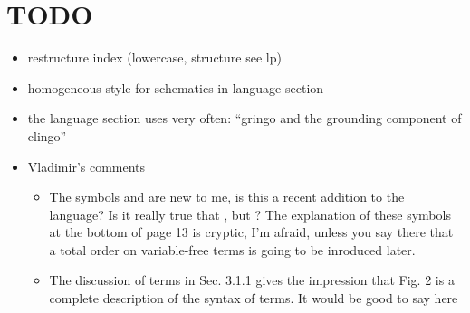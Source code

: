 \section{TODO}
\begin{itemize}
\item restructure index (lowercase, structure see lp)
\item homogeneous style for schematics in language section
\item the language section uses very often: ``gringo and the grounding component of clingo''
\item Vladimir's comments
\begin{itemize}
 \item 
  The symbols  and  are new to me, is this a recent addition to the
  language?  Is it really true that , but ?
  The explanation of these symbols at the bottom of page 13 is cryptic, I’m
  afraid, unless you say there that a total order on variable-free terms is
  going to be inroduced later.
 \item
  The discussion of terms in Sec. 3.1.1 gives the impression that Fig. 2 is a
  complete description of the syntax of terms.  It would be good to say here

\end{itemize}
\end{itemize}
